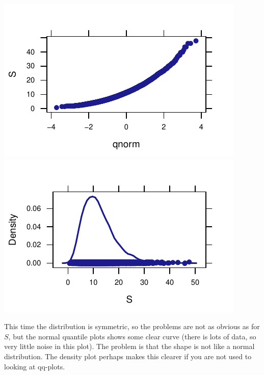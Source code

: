 \documentclass[twoside]{book}\usepackage[]{graphicx}\usepackage[]{xcolor}
\makeatletter
\def\maxwidth{ %
  \ifdim\Gin@nat@width>\linewidth
    \linewidth
  \else
    \Gin@nat@width
  \fi
}
\newenvironment{knitrout}{}{} %
\makeatother
\begin{document}
\begin{solution}
\begin{knitrout}
{\centering \includegraphics[width=\maxwidth]{figures/fig-unnamed-chunk-137-1} 
\includegraphics[width=\maxwidth]{figures/fig-unnamed-chunk-137-2} 

}



\end{knitrout}

This time the distribution is symmetric, so the problems are not as obvious as for $S$, but the 
normal quantile plots shows some clear curve (there is lots of data, so very little noise in
this plot).  The problem is that the shape is not like a normal distribution.  
The density plot perhaps makes this clearer if you are not used to looking at qq-plots.
\end{solution}

% 	
\end{document}
